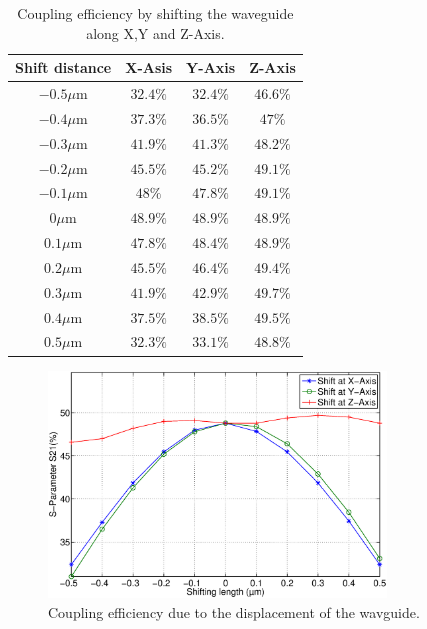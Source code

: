 \begin{table}[!ht]
\caption{Coupling efficiency by shifting the waveguide along X,Y and Z-Axis.}
\centering
\begin{tabular}{c|ccc}
\hline
Shift distance & X-Asis & Y-Axis & Z-Axis \\
\hline
$-0.5\mu$m 		&$32.4\%$	&$32.4\%$&$46.6\%$	\\
$-0.4\mu$m		&$37.3\%$	&$36.5\%$&$47\%$	\\
$-0.3\mu$m 		&$41.9\%$	&$41.3\%$&$48.2\%$	\\
$-0.2\mu$m	  &$45.5\%$	&$45.2\%$&$49.1\%$	\\
$-0.1\mu$m		&$48\%$	&$47.8\%$&$49.1\%$	\\
$0\mu$m			  &$48.9\%$	&$48.9\%$&$48.9\%$	\\
$0.1\mu$m			&$47.8\%$	&$48.4\%$&$48.9\%$	\\
$0.2\mu$m			&$45.5\%$	&$46.4\%$&$49.4\%$	\\
$0.3\mu$m			&$41.9\%$	&$42.9\%$&$49.7\%$	\\
$0.4\mu$m			&$37.5\%$	&$38.5\%$&$49.5\%$	\\
$0.5\mu$m			&$32.3\%$	&$33.1\%$&$48.8\%$	\\
\hline
\end{tabular}
\label{tab:shift_result}
\end{table}
\begin{figure}[!ht]
\centering
\includegraphics[width=0.8\textwidth]{bilder/shift_curve}
\caption{Coupling efficiency due to the displacement of the wavguide.}
\label{fig:shift_curve}
\end{figure}
